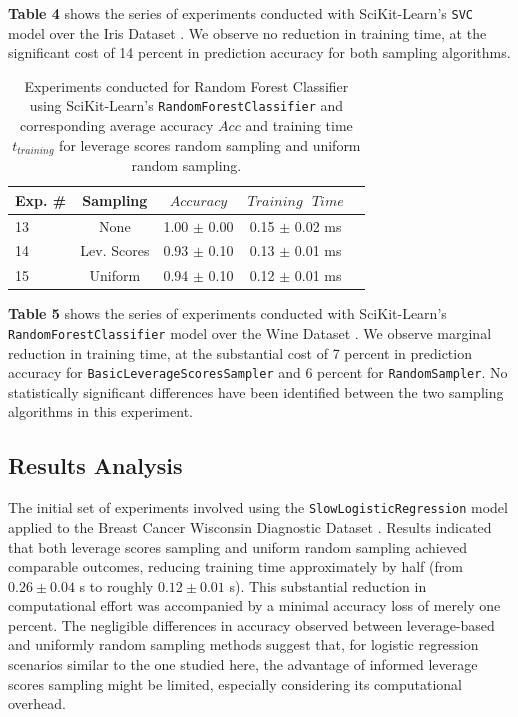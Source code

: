 \documentclass{article}
\theoremstyle{plain}
\theoremstyle{definition}
\theoremstyle{remark}
\begin{document}
\textbf{Table 4} shows the series of experiments conducted with SciKit-Learn's \texttt{SVC} model over the Iris Dataset \cite{iris}. We observe no reduction in training time, at the significant cost of 14 percent in prediction accuracy for both sampling algorithms.

\begin{table}[t]
	\caption{Experiments conducted for Random Forest Classifier using SciKit-Learn's \texttt{RandomForestClassifier} and corresponding average accuracy $Acc$ and training time $t_{training}$ for leverage scores random sampling and uniform random sampling.}
	\label{t5}
	\vskip 0.15in
	\begin{center}
		\begin{small}
			\begin{sc}
				\begin{tabular}{lcccr}
					\toprule
					Exp. \# & Sampling & $Accuracy$ & $Training \text{ } Time$\\
					\midrule
					13 & None & 1.00 $\pm$ 0.00 & 0.15 $\pm$ 0.02 ms \\
					14 & Lev. Scores & 0.93 $\pm$ 0.10 & 0.13 $\pm$ 0.01 ms \\
					15 & Uniform & 0.94 $\pm$ 0.10 & 0.12 $\pm$ 0.01 ms \\
					\bottomrule
				\end{tabular}
			\end{sc}
		\end{small}
	\end{center}
	\vskip -0.1in
\end{table}

\textbf{Table 5} shows the series of experiments conducted with SciKit-Learn's \texttt{RandomForestClassifier} model over the Wine Dataset \cite{wine}. We observe marginal reduction in training time, at the substantial cost of 7 percent in prediction accuracy for \texttt{BasicLeverageScoresSampler} and 6 percent for \texttt{RandomSampler}. No statistically significant differences have been identified between the two sampling algorithms in this experiment.


\subsection{Results Analysis}

The initial set of experiments involved using the \texttt{SlowLogisticRegression} model applied to the Breast Cancer Wisconsin Diagnostic Dataset \cite{breastcancer}. Results indicated that both leverage scores sampling and uniform random sampling achieved comparable outcomes, reducing training time approximately by half (from $0.26 \pm 0.04$ s to roughly $0.12 \pm 0.01$ s). This substantial reduction in computational effort was accompanied by a minimal accuracy loss of merely one percent. The negligible differences in accuracy observed between leverage-based and uniformly random sampling methods suggest that, for logistic regression scenarios similar to the one studied here, the advantage of informed leverage scores sampling might be limited, especially considering its computational overhead.
\end{document}
